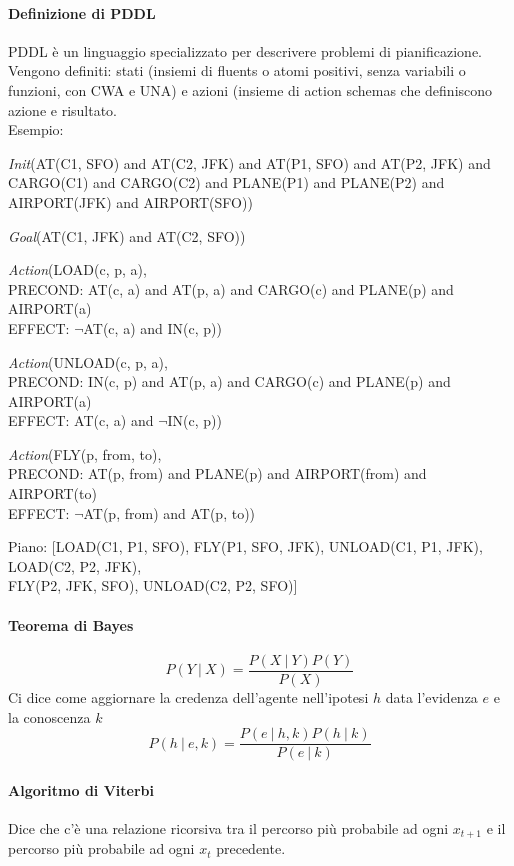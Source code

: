 \documentclass[10pt]{report}
\begin{document}
\paragraph{Definizione di PDDL} PDDL è un linguaggio specializzato per descrivere problemi di pianificazione. Vengono definiti: stati (insiemi di fluents o atomi positivi, senza variabili o funzioni, con CWA e UNA) e azioni (insieme di action schemas che definiscono azione e risultato.\\
Esempio:
\begin{list}{}{}
	\item \textit{Init}(AT(C1, SFO) and AT(C2, JFK) and AT(P1, SFO) and AT(P2, JFK) and CARGO(C1) and CARGO(C2) and PLANE(P1) and PLANE(P2) and AIRPORT(JFK) and AIRPORT(SFO))
	\item \textit{Goal}(AT(C1, JFK) and AT(C2, SFO))
	\item \textit{Action}(LOAD(c, p, a),\\
	PRECOND: AT(c, a) and AT(p, a) and CARGO(c) and PLANE(p) and AIRPORT(a)\\
	EFFECT: $\neg$AT(c, a) and IN(c, p))
	\item \textit{Action}(UNLOAD(c, p, a),\\
	PRECOND: IN(c, p) and AT(p, a) and CARGO(c) and PLANE(p) and AIRPORT(a)\\
	EFFECT: AT(c, a) and $\neg$IN(c, p))
	\item \textit{Action}(FLY(p, from, to),\\
	PRECOND: AT(p, from) and PLANE(p) and AIRPORT(from) and AIRPORT(to)\\
	EFFECT: $\neg$AT(p, from) and AT(p, to))
	\item Piano: [LOAD(C1, P1, SFO), FLY(P1, SFO, JFK), UNLOAD(C1, P1, JFK), LOAD(C2, P2, JFK),\\FLY(P2, JFK, SFO), UNLOAD(C2, P2, SFO)]
\end{list}
\paragraph{Teorema di Bayes} $$P(Y\:|\:X) = \frac{P(X\:|\:Y)P(Y)}{P(X)}$$
Ci dice come aggiornare la credenza dell'agente nell'ipotesi $h$ data l'evidenza $e$ e la conoscenza $k$
$$P(h\:|\:e,k) = \frac{P(e\:|\:h,k)P(h\:|\:k)}{P(e\:|\:k)}$$
\paragraph{Algoritmo di Viterbi} Dice che c'è una relazione ricorsiva tra il percorso più probabile ad ogni $x_{t+1}$ e il percorso più probabile ad ogni  $x_t$ precedente.
\end{document}
